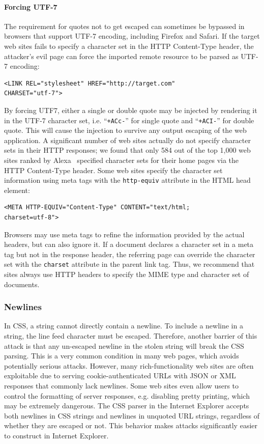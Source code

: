 \documentclass{acm_proc_article-sp}
\begin{document}
\paragraph{Forcing UTF-7}
The requirement for quotes not to get escaped can sometimes be bypassed in browsers that support UTF-7 encoding, including Firefox and Safari. If the target web sites fails to specify a character set in the HTTP Content-Type header, the attacker's evil page can force the imported remote resource to be parsed as UTF-7 encoding:
\begin{verbatim}
<LINK REL="stylesheet" HREF="http://target.com"
CHARSET="utf-7">
\end{verbatim}
By forcing UTF7, either a single or double quote may be injected by rendering it in the UTF-7 character set, i.e. ``\texttt{+ACc-}'' for single quote and ``\texttt{+ACI-}'' for double quote. This will cause the injection to survive any output escaping of the web application. A significant number of web sites actually do not specify character sets in their HTTP responses; we found that only 584 out of the top 1,000 web sites ranked by Alexa~\cite{alexa} specified character sets for their home pages via the HTTP Content-Type header. Some web sites specify the character set information using meta tags with the \texttt{http-equiv} attribute in the HTML head element:
\begin{verbatim}
<META HTTP-EQUIV="Content-Type" CONTENT="text/html;
charset=utf-8">
\end{verbatim}
Browsers may use meta tags to refine the information provided by the actual headers, but can also ignore it. If a document declares a character set in a meta tag but not in the response header, the referring page can override the character set with the \texttt{charset} attribute in the parent link tag. Thus, we recommend that sites always use HTTP headers to specify the MIME type and character set of documents.

\subsubsection{Newlines}
In CSS, a string cannot directly contain a newline. To include a newline in a string, the line feed character must be escaped. Therefore, another barrier of this attack is that any un-escaped newline in the stolen string will break the CSS parsing. This is a very common condition in many web pages, which avoids potentially serious attacks. However, many rich-functionality web sites are often exploitable due to serving cookie-authenticated URLs with JSON or XML responses that commonly lack newlines. Some web sites even allow users to control the formatting of server responses, e.g. disabling pretty printing, which may be extremely dangerous.
The CSS parser in the Internet Explorer accepts both newlines in CSS strings and newlines in unquoted URL strings, regardless of whether they are escaped or not. This behavior makes attacks significantly easier to construct in Internet Explorer.
\end{document}
